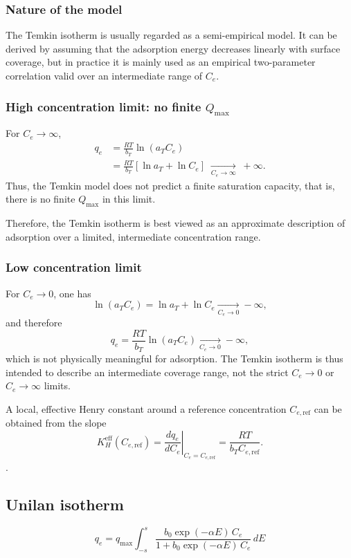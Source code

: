 \documentclass[12pt]{article}
\begin{document}
	\subsubsection{Nature of the model}
	
	The Temkin isotherm is usually regarded as a semi-empirical model. It can be
	derived by assuming that the adsorption energy decreases linearly with surface
	coverage, but in practice it is mainly used as an empirical two-parameter
	correlation valid over an intermediate range of $C_e$.
	
	\subsubsection{High concentration limit: no finite $Q_{\max}$}
	
	For $C_e \to \infty$,
	\begin{align}
		q_e 
		&= \frac{RT}{b_T} \ln(a_T C_e) \nonumber \\
		&= \frac{RT}{b_T} \left[\ln a_T + \ln C_e\right]
		\;\xrightarrow[C_e \to \infty]{}\; +\infty.
	\end{align}
	Thus, the Temkin model does not predict a finite saturation capacity, that is, there is no finite $Q_{\max}$ in this limit.
	
	Therefore, the Temkin isotherm is best viewed as an approximate description of adsorption over a limited, intermediate concentration range.
	
	\subsubsection{Low concentration limit}
	
	For $C_e \to 0$, one has
	\[
	\ln(a_T C_e) = \ln a_T + \ln C_e \xrightarrow[C_e \to 0]{} -\infty,
	\]
	and therefore
	\[
	q_e = \frac{RT}{b_T} \ln(a_T C_e) \xrightarrow[C_e \to 0]{} -\infty,
	\]
	which is not physically meaningful for adsorption. The Temkin isotherm is thus intended to describe an intermediate coverage range, not the strict $C_e \to 0$ or $C_e \to \infty$ limits.
	
	A local, effective Henry constant around a reference concentration $C_{e,\mathrm{ref}}$ can be obtained from the slope
	\[
	K_H^{\mathrm{eff}}(C_{e,\mathrm{ref}})
	= \left.\frac{d q_e}{d C_e}\right|_{C_e = C_{e,\mathrm{ref}}}
	= \frac{RT}{b_T C_{e,\mathrm{ref}}}.
	\].
	
	
	\subsection{Unilan isotherm}
	\[
	q_e = q_{\max} \int_{-s}^{s} \frac{b_0 \exp(-\alpha E)\, C_e}{1 + b_0 \exp(-\alpha E)\, C_e} \, dE
	\]
	
\end{document}
